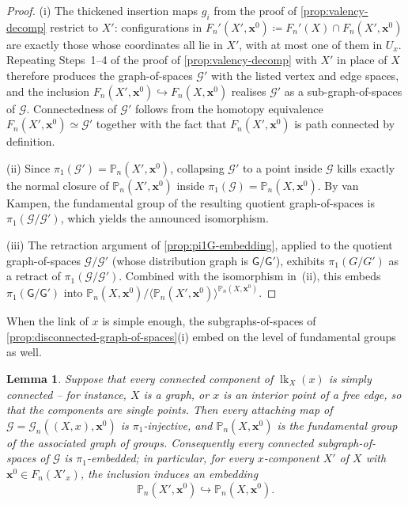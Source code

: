 \documentclass[reqno]{amsart}
\newtheorem{lemma}[theorem]{Lemma}
\theoremstyle{definition}
\newcommand\bfx{\mathbf{x}}
\newcommand\cG{\mathcal{G}}
\newcommand\sfG{\mathsf{G}}
\newcommand{\PB}{\mathbb{P}}
\newcommand{\co}[1]{\mathopen{\langle}#1\mathclose{\rangle}} %
\newcommand{\base}{\bfx^0}
\DeclareMathOperator{\lk}{lk}
\numberwithin{equation}{section}
\begin{document}
\begin{proof}
(i) The thickened insertion maps \(g_i\) from the proof of
\cref{prop:valency-decomp} restrict to \(X'\):
configurations in
\(F_n'(X',\base)\coloneqq F_n'(X)\cap F_n(X',\base)\) are exactly
those whose coordinates all lie in \(X'\), with at most one of
them in \(U_x\). Repeating Steps~1--4 of the proof of
\cref{prop:valency-decomp} with \(X'\) in place of \(X\)
therefore produces the graph-of-spaces \(\cG'\) with the
listed vertex and edge spaces, and the inclusion
\(F_n(X',\base)\hookrightarrow F_n(X,\base)\) realises
\(\cG'\) as a sub-graph-of-spaces of \(\cG\).
Connectedness of \(\cG'\) follows from the homotopy
equivalence \(F_n(X',\base)\simeq\cG'\) together with the
fact that \(F_n(X',\base)\) is path connected by definition.

(ii) Since \(\pi_1(\cG')=\PB_n(X',\base)\), collapsing
\(\cG'\) to a point inside \(\cG\) kills exactly the
normal closure of \(\PB_n(X',\base)\) inside
\(\pi_1(\cG)=\PB_n(X,\base)\). By van Kampen, the
fundamental group of the resulting quotient graph-of-spaces is
\(\pi_1(\cG/\cG')\), which yields the announced
isomorphism.

(iii) The retraction argument of
\cref{prop:pi1G-embedding}, applied to the quotient
graph-of-spaces \(\cG/\cG'\) (whose distribution graph
is \(\sfG/\sfG'\)), exhibits \(\pi_1(G/G')\) as a retract of
\(\pi_1(\cG/\cG')\). Combined with the isomorphism
in~(ii), this embeds \(\pi_1(\sfG/\sfG')\) into
\(\PB_n(X,\base)/\co{\PB_n(X',\base)}^{\PB_n(X,\base)}\).
\end{proof}

When the link of \(x\) is simple enough, the subgraphs-of-spaces of
\cref{prop:disconnected-graph-of-spaces}(i) embed on the level of
fundamental groups as well.

\begin{lemma}\label{lem:x-component-embedding}
Suppose that every connected component of \(\lk_X(x)\) is simply
connected -- for instance, \(X\) is a graph, or \(x\) is an
interior point of a free edge, so that the components are single
points. Then every attaching map of \(\cG=\cG_n((X,x),\base)\) is
\(\pi_1\)-injective, and \(\PB_n(X,\base)\) is the fundamental
group of the associated graph of groups. Consequently every
connected subgraph-of-spaces of \(\cG\) is \(\pi_1\)-embedded; in
particular, for every \(x\)-component \(X'\) of \(X\) with
\(\base\in F_n(X'_x)\), the inclusion induces an embedding
\[
\PB_n(X',\base)\hookrightarrow\PB_n(X,\base).
\]
\end{lemma}
\end{document}
